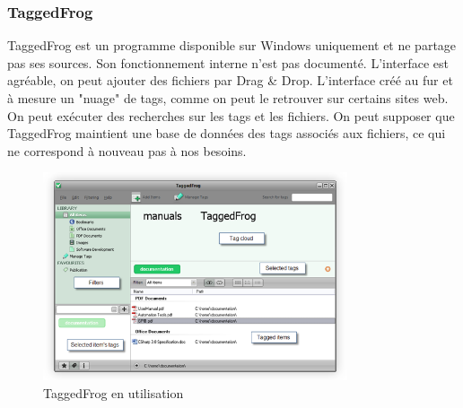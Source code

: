 \documentclass[a4paper, 12pt]{article}
\begin{document}
\subsubsection{TaggedFrog}
TaggedFrog \cite{ref18} est un programme disponible sur Windows uniquement et ne partage pas ses sources.
Son fonctionnement interne n'est pas documenté. L'interface est agréable, on peut ajouter des fichiers 
par Drag \& Drop. L'interface créé au fur et à mesure un "nuage" de tags, comme on peut le retrouver sur 
certains sites web. On peut exécuter des recherches sur les tags et les fichiers. On peut supposer que 
TaggedFrog maintient une base de données des tags associés aux fichiers, ce qui ne correspond à nouveau 
pas à nos besoins.
\begin{figure}
    \begin{center}
        \includegraphics[width=0.8\textwidth]{images/taggedfrog.png}
    \end{center}
    \caption{TaggedFrog en utilisation \cite{ref18}}
    \label{taggedfrog}
\end{figure}
\end{document}
